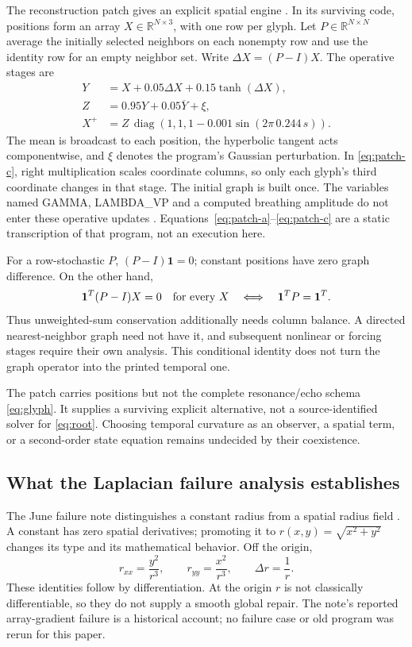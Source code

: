 \documentclass[11pt,a4paper]{article}
\theoremstyle{definition}
\newcommand{\R}{\mathbb R}
\numberwithin{equation}{section}
\begin{document}
The reconstruction patch gives an explicit spatial engine
\cite[physical pp.~1--2, \S\S2--3]{P05}. In its surviving code, positions
form an array $X\in\R^{N\times3}$, with one row per glyph. Let
$P\in\R^{N\times N}$ average the initially selected neighbors on each
nonempty row and use the identity row for an empty neighbor set. Write
$\Delta X=(P-I)X$. The operative stages are
\begin{align}
 Y&=X+0.05\Delta X+0.15\tanh(\Delta X),\label{eq:patch-a}\\
 Z&=0.95Y+0.05\overline Y+\xi,\label{eq:patch-b}\\
 X^+&=Z\,\operatorname{diag}
 (1,1,1-0.001\sin(2\pi\,0.244\,s)).
 \label{eq:patch-c}
\end{align}
The mean is broadcast to each position, the hyperbolic tangent acts
componentwise, and $\xi$ denotes the program's Gaussian perturbation.
In \eqref{eq:patch-c}, right multiplication scales coordinate columns, so
only each glyph's third coordinate changes in that stage.
The initial graph is built once. The variables named GAMMA, LAMBDA\_VP
and a computed breathing amplitude do not enter these operative updates
\cite[lines 31--40,45--78]{Position}.
Equations~\eqref{eq:patch-a}--\eqref{eq:patch-c} are a static transcription
of that program, not an execution here.

For a row-stochastic $P$, $(P-I)\mathbf1=0$; constant positions have zero
graph difference. On the other hand,
\[
 \mathbf1^T(P-I)X=0\quad\hbox{for every }X
 \quad\Longleftrightarrow\quad \mathbf1^TP=\mathbf1^T.
\]
Thus unweighted-sum conservation additionally needs column balance. A
directed nearest-neighbor graph need not have it, and subsequent nonlinear
or forcing stages require their own analysis. This conditional identity
does not turn the graph operator into the printed temporal one.

The patch carries positions but not the complete resonance/echo schema
\eqref{eq:glyph}. It supplies a surviving explicit alternative, not a
source-identified solver for \eqref{eq:root}. Choosing temporal curvature
as an observer, a spatial term, or a second-order state equation remains
undecided by their coexistence.

\subsection{What the Laplacian failure analysis establishes}

The June failure note distinguishes a constant radius from a spatial
radius field \cite[physical p.~1, \S\S1--3]{P11}.
A constant has zero spatial derivatives; promoting it to
$r(x,y)=\sqrt{x^2+y^2}$ changes its type and its mathematical behavior.
Off the origin,
\begin{equation}
 r_{xx}=\frac{y^2}{r^3},\qquad
 r_{yy}=\frac{x^2}{r^3},\qquad
 \Delta r=\frac1r.
 \label{eq:radius-laplacian}
\end{equation}
These identities follow by differentiation. At the origin $r$ is not
classically differentiable, so they do not supply a smooth global repair.
The note's reported array-gradient failure is a historical account; no
failure case or old program was rerun for this paper.
\end{document}
